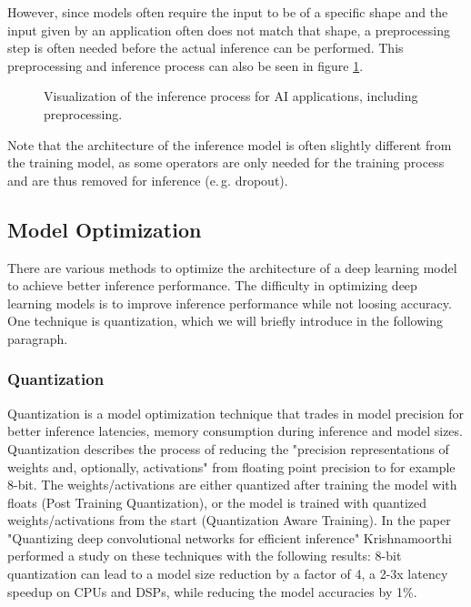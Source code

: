 However, since models often require the input to be of a specific shape and the input given by an application often does not match that shape, a preprocessing step is often needed before the actual inference can be performed.
This preprocessing and inference process can also be seen in figure \ref{fig:InfProcess}.
\begin{figure}[H]
\centering

\caption{Visualization of the inference process for AI applications, including preprocessing.}
\label{fig:InfProcess}
\end{figure}
Note that the architecture of the inference model is often slightly different from the training model, as some operators are only needed for the training process and are thus removed for inference (e.\,g. dropout).





\subsection{Model Optimization}
There are various methods to optimize the architecture of a deep learning model to achieve better inference performance.
The difficulty in optimizing deep learning models is to improve inference performance while not loosing accuracy.
One technique is quantization, which we will briefly introduce in the following paragraph.
\subsubsection{Quantization}
\label{chap:quant}
Quantization is a model optimization technique that trades in model precision for better inference latencies, memory consumption during inference and model sizes.
Quantization describes the process of reducing the "precision representations of weights and, optionally, activations" \cite{tfLiteQuant} from floating point precision to for example 8-bit.
The weights/activations are either quantized after training the model with floats (Post Training Quantization), or the model is trained with quantized weights/activations from the start (Quantization Aware Training). In the paper "Quantizing deep convolutional networks for
efficient inference"\cite{Quantizing} Krishnamoorthi performed a study on these techniques with the following results:
8-bit quantization can lead to a model size reduction by a factor of 4, a 2-3x latency speedup on CPUs and DSPs, while reducing the model accuracies by 1\%.


